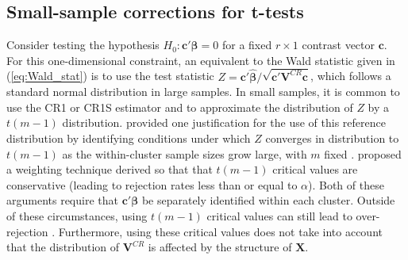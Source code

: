 \documentclass[12pt]{article}\usepackage[]{graphicx}\usepackage[]{color}
\newcommand{\bm}{\mathbf}
\newcommand{\bs}{\boldsymbol}
\begin{document}
\subsection{Small-sample corrections for t-tests}
\label{subsec:t-tests}

Consider testing the hypothesis $H_0: \bm{c}'\bs\beta = 0$ for a fixed $r \times 1$ contrast vector $\bm{c}$. 
For this one-dimensional constraint, an equivalent to the Wald statistic given in (\ref{eq:Wald_stat}) is to use the test statistic $Z = \bm{c}'\bs{\hat\beta} / \sqrt{\bm{c}'\bm{V}^{CR}\bm{c}}$, which follows a standard normal distribution in large samples. 
In small samples, it is common to use the CR1 or CR1S estimator and to approximate the distribution of $Z$ by a $t(m - 1)$ distribution. 
\citet{Hansen2007asymptotic} provided one justification for the use of this reference distribution by identifying conditions under which $Z$ converges in distribution to $t(m-1)$ as the within-cluster sample sizes grow large, with $m$ fixed \citep[see also][]{Donald2007inference}. 
\citet{Ibragimov2010tstatistic} proposed a weighting technique derived so that that $t(m-1)$ critical values are conservative (leading to rejection rates less than or equal to $\alpha$).
Both of these arguments require that $\bm{c}'\bs\beta$ be separately identified within each cluster. 
Outside of these circumstances, using $t(m-1)$ critical values can still lead to over-rejection \citep{Cameron2015practitioners}. 
Furthermore, using these critical values does not take into account that the distribution of $\bm{V}^{CR}$ is affected by the structure of $\bm{X}$. 
\end{document}

